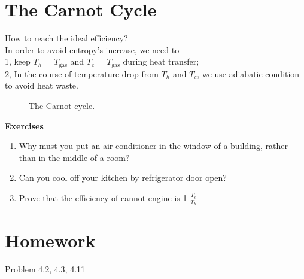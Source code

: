 \section{The Carnot Cycle}
How to reach the ideal efficiency?\\
In order to avoid entropy's increase, we need to \\
1, keep $T_h$ = $T_\text{gas}$ and $T_c$ = $T_\text{gas}$ during heat transfer;\\
2, In the course of temperature drop from $T_h$ and $T_c$, we use adiabatic condition to avoid heat waste.
\begin{figure}[ht]
\centering
{}
\caption{The Carnot cycle.}
\end{figure}

{\bf Exercises}\\
\begin{enumerate}
\item Why must you put an air conditioner in the window of a building, rather than in the middle of a room?
\item Can you cool off your kitchen by refrigerator door open?
\item Prove that the efficiency of cannot engine is 1-$\frac{T_c}{T_h}$
\end{enumerate}

\section{Homework}
Problem 4.2, 4.3, 4.11


